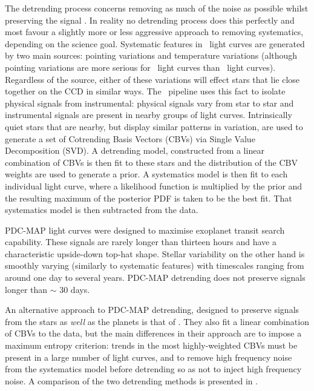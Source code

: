 The detrending process concerns removing as much of the noise as possible
whilst preserving the signal \citep{Smith2012, Stumpe2012}.
In reality no detrending process does this perfectly and most favour a
slightly more or less aggressive approach to removing systematics, depending
on the science goal.
Systematic features in \kepler\ light curves are generated by two main
sources: pointing variations and temperature variations (although pointing
variations are more serious for \ktwo\ light curves than \kepler\ light
curves).
Regardless of the source, either of these variations will effect stars that
lie close together on the CCD in similar ways.
The \kepler\ pipeline uses this fact to isolate physical signals from
instrumental: physical signals vary from star to star and instrumental signals
are present in nearby groups of light curves.
Intrinsically quiet stars that are nearby, but display similar patterns in
variation, are used to generate a set of Cotrending Basis Vectors (CBVs) via
Single Value Decomposition (SVD).
A detrending model, constructed from a linear combination of CBVs is then fit
to these stars and the distribution of the CBV weights are used to generate a
prior.
A systematics model is then fit to each individual light curve, where a
likelihood function is multiplied by the prior and the resulting maximum of
the posterior PDF is taken to be the best fit.
That systematics model is then subtracted from the data.

PDC-MAP light curves were designed to maximise exoplanet transit search
capability.
These signals are rarely longer than thirteen hours and have a characteristic
upside-down top-hat shape.
Stellar variability on the other hand is smoothly varying (similarly to
systematic features) with timescales ranging from around one day to several
years.
PDC-MAP detrending does not preserve signals longer than $\sim$ 30 days.

An alternative approach to PDC-MAP detrending, designed to preserve signals
from the stars as {\it well} as the planets is that of \citet{Roberts2013}.
They also fit a linear combination of CBVs to the data, but the main
differences in their approach are to impose a maximum entropy criterion:
trends in the most highly-weighted CBVs must be present in a large number of
light curves, and to remove high frequency noise from the systematics model
before detrending so as not to inject high frequency noise.
A comparison of the two detrending methods is presented in
\citet{Roberts2013}.

